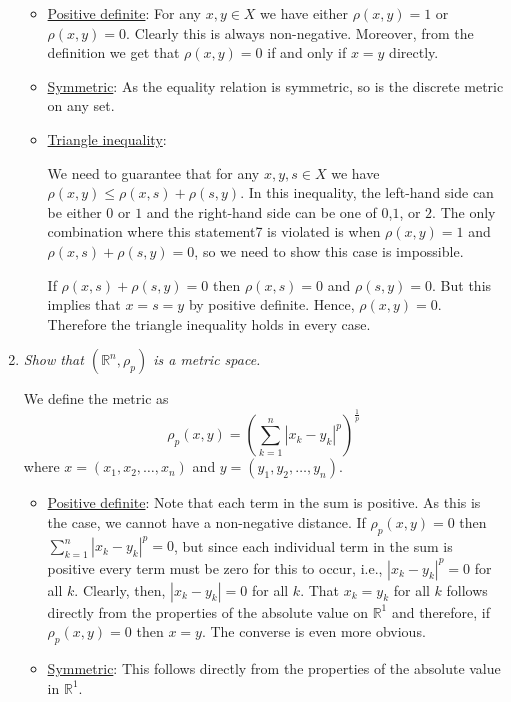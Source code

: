 \documentclass[11pt]{article}
\begin{document}
\begin{enumerate}
\begin{itemize}
\item \underline{Positive definite}:
For any $x,y \in X$ we have either $\rho(x,y)=1$ or $\rho(x,y)=0$.  Clearly this is always non-negative.  Moreover, from the definition we get that $\rho(x,y)=0$ if and only if $x=y$ directly.

\item \underline{Symmetric}:
As the equality relation is symmetric, so is the discrete metric on any set.

\item \underline{Triangle inequality}:

We need to guarantee that for any $x,y,s \in X$ we have $\rho(x,y) \leq \rho(x,s) + \rho(s,y)$.  In this inequality, the left-hand side can be either $0$ or $1$ and the right-hand side can be one of $0$,$1$, or $2$.  The only combination where this statement7 is violated is when $\rho(x,y)=1$ and $\rho(x,s) + \rho(s,y) = 0$, so we need to show this case is impossible.

If $\rho(x,s) + \rho(s,y) = 0$ then $\rho(x,s)=0$ and $\rho(s,y)=0$.  But this implies that $x=s=y$ by positive definite.
Hence, $\rho(x,y)=0$.  Therefore the triangle inequality holds in every case.

\end{itemize}
\item \emph{Show that $(\mathbb{R}^n,\rho_p)$ is a metric space.}

We define the metric as
\[ \rho_p(x,y) = \left(\sum_{k=1}^n|x_k-y_k|^p\right)^\frac{1}{p} \]
where $x=(x_1,x_2,\ldots,x_n)$ and $y=(y_1,y_2,\ldots,y_n)$.

\begin{itemize}
\item \underline{Positive definite}:
Note that each term in the sum is positive.  As this is the case, we cannot have a non-negative distance. If $\rho_p(x,y)=0$ then $\sum_{k=1}^n|x_k-y_k|^p = 0$, but since each individual term in the sum is positive every term must be zero for this to occur, i.e., $|x_k-y_k|^p = 0$ for all $k$.  Clearly, then, $|x_k-y_k| = 0$ for all $k$.  That $x_k=y_k$ for all $k$ follows directly from the properties of the absolute value on $\mathbb{R}^1$ and therefore, if $\rho_p(x,y)=0$ then $x=y$.  The converse is even more obvious.

\item \underline{Symmetric}:
This follows directly from the properties of the absolute value in $\mathbb{R}^1$.


\end{itemize}
\end{enumerate}
\end{document}
